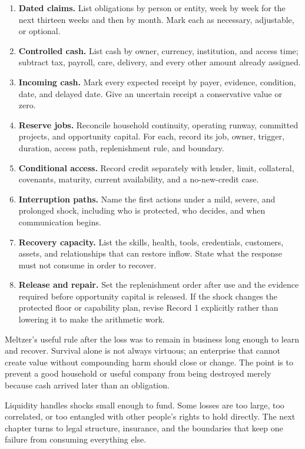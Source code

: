 \begin{enumerate}[itemsep=0.13em]
\item \textbf{Dated claims.} List obligations by person or entity, week by week
  for the next thirteen weeks and then by month. Mark each as necessary,
  adjustable, or optional.
\item \textbf{Controlled cash.} List cash by owner, currency, institution, and
  access time; subtract tax, payroll, care, delivery, and every other amount
  already assigned.
\item \textbf{Incoming cash.} Mark every expected receipt by payer, evidence,
  condition, date, and delayed date. Give an uncertain receipt a conservative
  value or zero.
\item \textbf{Reserve jobs.} Reconcile household continuity, operating runway,
  committed projects, and opportunity capital. For each, record its job,
  owner, trigger, duration, access path, replenishment rule, and boundary.
\item \textbf{Conditional access.} Record credit separately with lender,
  limit, collateral, covenants, maturity, current availability, and a
  no-new-credit case.
\item \textbf{Interruption paths.} Name the first actions under a mild, severe,
  and prolonged shock, including who is protected, who decides, and when
  communication begins.
\item \textbf{Recovery capacity.} List the skills, health, tools, credentials,
  customers, assets, and relationships that can restore inflow. State what the
  response must not consume in order to recover.
\item \textbf{Release and repair.} Set the replenishment order after use and
  the evidence required before opportunity capital is released. If the shock
  changes the protected floor or capability plan, revise Record 1 explicitly
  rather than lowering it to make the arithmetic work.
\end{enumerate}

Meltzer's useful rule after the loss was to remain in business long enough to
learn and recover. Survival alone is not always virtuous; an enterprise that
cannot create value without compounding harm should close or change. The point
is to prevent a good household or useful company from being destroyed merely
because cash arrived later than an obligation.

Liquidity handles shocks small enough to fund. Some losses are too large, too
correlated, or too entangled with other people's rights to hold directly. The
next chapter turns to legal structure, insurance, and the boundaries that keep
one failure from consuming everything else.
